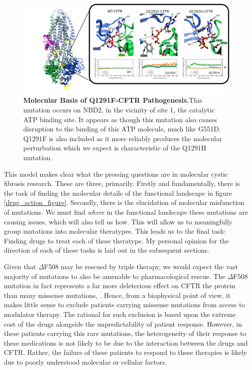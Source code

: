\begin{figure}
	\begin{center}
		\includegraphics[width=\textwidth]{figures/perspective/Q1291.pdf}
	\end{center}
	\captionsetup{singlelinecheck = false, justification=raggedright}
	\caption[Molecular Basis of Q1291F-CFTR Pathogenesis]{\textbf{Molecular Basis of Q1291F-CFTR Pathogenesis.}{This mutation occurs on NBD2, in the vicinity of site 1, the catalytic ATP binding site. It appears as though this mutation also causes disruption to the binding of this ATP molecule, much like G551D. Q1291F is also included as it more reliably produces the molecular perturbation which we expect is characteristic of the Q1291H mutation. }}

\end{figure}



This model makes clear what the pressing questions are in molecular cystic fibrosis research. These are three, primarily. Firstly and fundamentally, there is the task of finding the molecular details of the functional landscape in figure \ref{drug_action_figure}. Secondly, there is the elucidation of molecular misfunction of mutations. We must find \textit {where} in the functional landscape these mutations are causing issues, which will also tell us how. This will allow us to meaningfully group mutations into molecular theratypes. This leads us to the final task: Finding drugs to treat each of these theratype. My personal opinion for the direction of each of these tasks is laid out in the subsequent sections.

Given that $\Delta$F508 may be rescued by triple therapy, we would expect the vast majority of mutations to also be amenable to pharmacological rescue. The $\Delta$F508 mutation in fact represents a far more deleterious effect on CFTR the protein than many missense mutations, \cite{bahia2021}. Hence, from a biophysical point of view, it makes little sense to exclude patients carrying missense mutations from access to modulator therapy. The rational for such exclusion is based upon the extreme cost of the drugs alongside the unpredictability of patient response. However, in these patients carrying this rare mutations, the heterogeneity of their response to these medications is not likely to be due to the interaction between the drugs and CFTR. Rather, the failure of these patients to respond to these therapies is likely due to poorly understood molecular or cellular factors. 

